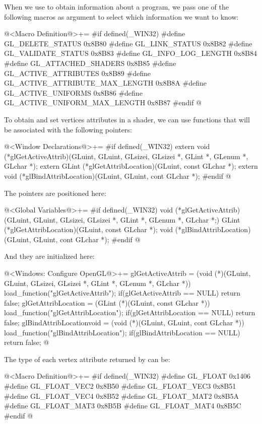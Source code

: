 When we use  to obtain information about a
program, we pass one of the following macros as argument to select
which information we want to know:

\iniciocodigo
@<Macro Definition@>+=
#if defined(_WIN32)
#define GL_DELETE_STATUS               0x8B80
#define GL_LINK_STATUS                 0x8B82
#define GL_VALIDATE_STATUS             0x8B83
#define GL_INFO_LOG_LENGTH             0x8B84
#define GL_ATTACHED_SHADERS            0x8B85
#define GL_ACTIVE_ATTRIBUTES           0x8B89
#define GL_ACTIVE_ATTRIBUTE_MAX_LENGTH 0x8B8A
#define GL_ACTIVE_UNIFORMS             0x8B86
#define GL_ACTIVE_UNIFORM_MAX_LENGTH   0x8B87
#endif
@
\fimcodigo

To obtain and set vertices attributes in a shader, we can use
functions that will be associated with the following pointers:

\iniciocodigo
@<Window Declarations@>+=
#if defined(_WIN32)
extern void (*glGetActiveAttrib)(GLuint, GLuint, GLsizei, GLsizei *, GLint *,
                                 GLenum *, GLchar *);
extern GLint (*glGetAttribLocation)(GLuint, const GLchar *);
extern void (*glBindAttribLocation)(GLuint, GLuint, cont GLchar *);
#endif
@
\fimcodigo

The pointers are positioned here:

\iniciocodigo
@<Global Variables@>+=
#if defined(_WIN32)
void (*glGetActiveAttrib)(GLuint, GLuint, GLsizei, GLsizei *, GLint *,
                                 GLenum *, GLchar *;)
GLint (*glGetAttribLocation)(GLuint, const GLchar *);
void (*glBindAttribLocation)(GLuint, GLuint, cont GLchar *);
#endif
@
\fimcodigo

And they are initialized here:

\iniciocodigo
@<Windows: Configure OpenGL@>+=
glGetActiveAttrib = (void (*)(GLuint, GLuint, GLsizei, GLsizei *, GLint *,
                     GLenum *, GLchar *)) load_function("glGetActiveAttrib");
if(glGetActiveAttrib == NULL) return false;
glGetAttribLocation = (GLint (*)(GLuint, const GLchar *))
                           load_function("glGetAttribLocation");
if(glGetAttribLocation == NULL) return false;
glBindAttribLocationvoid = (void (*)(GLuint, GLuint, cont GLchar *))
                              load_function("glBindAttribLocation");
if(glBindAttribLocation == NULL) return false;
@
\fimcodigo

The type of each vertex attribute returned
by  can be:

\iniciocodigo
@<Macro Definition@>+=
#if defined(_WIN32)
#define GL_FLOAT      0x1406
#define GL_FLOAT_VEC2 0x8B50
#define GL_FLOAT_VEC3 0x8B51
#define GL_FLOAT_VEC4 0x8B52
#define GL_FLOAT_MAT2 0x8B5A
#define GL_FLOAT_MAT3 0x8B5B
#define GL_FLOAT_MAT4 0x8B5C
#endif
@
\fimcodigo


